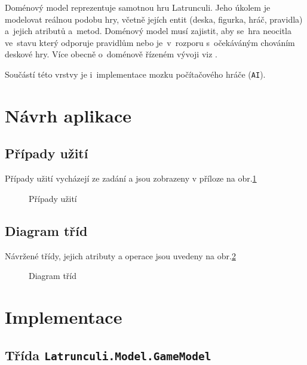 \documentclass[12pt]{article}
\begin{document}
Doménový model reprezentuje samotnou hru Latrunculi. Jeho úkolem je modelovat reálnou podobu hry, včetně jejích entit (deska, figurka, hráč, pravidla) a~jejich atributů a~metod. Doménový model musí zajistit, aby se~hra neocitla ve~stavu který odporuje pravidlům nebo je~v~rozporu s~očekáváným chováním deskové hry. Více obecně o~doménově řízeném vývoji viz \cite{wlaschin2}.

Součástí této vrstvy je i~implementace mozku počítačového hráče (\texttt{AI}).

\section{Návrh aplikace}
\subsection{Případy užití}
Případy užití vycházejí ze zadání a jsou zobrazeny v příloze na obr.\ref{PrimaryUseCases}

\begin{figure}[ht]
	\epsfysize=200mm
	\caption{Případy užití}
	\label{PrimaryUseCases}
\end{figure}

\subsection{Diagram tříd}
Návržené třídy, jejich atributy a operace jsou uvedeny na obr.\ref{UIClassDiagram}

\begin{figure}[ht]
	\epsfysize=200mm
	\caption{Diagram tříd}
	\label{UIClassDiagram}
\end{figure}

\section{Implementace}
\subsection{Třída \texttt{Latrunculi.Model.GameModel}}
\end{document}
